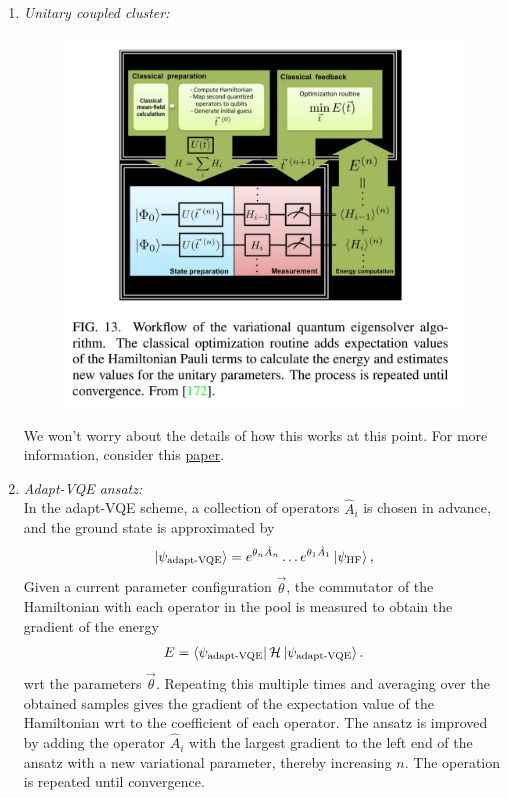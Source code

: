 \documentclass{book}
\theoremstyle{definition}
\newcommand{\had}{\mathcal{H}}
\begin{document}
\begin{enumerate}
	\item \textit{Unitary coupled cluster:} \\
	
	\begin{figure}[!htb]
		\centering
		\includegraphics[scale=0.3]{vqei}
	\end{figure}
	We won't worry about the details of how this works at this point. For more information, consider this \href{https://iopscience.iop.org/article/10.1088/2058-9565/aad3e4/pdf}{\underline{paper}}.
	

	
	\item \textit{Adapt-VQE ansatz:}\\
	
	In the adapt-VQE scheme, a collection of operators $\hat{A}_i$ is chosen in advance, and the ground state is approximated by 
	\begin{align}
	\ket{\psi_{\text{adapt-VQE}}} = e^{\theta_n \hat{A}_n}\dots e^{\theta_1 \hat{A}_1}\ket{\psi_{\text{HF}}},
	\end{align}
	Given a current parameter configuration $\vec{\theta}$, the commutator  of the Hamiltonian with each operator in the pool is measured to obtain the gradient of the energy
	\begin{align}
	E = \bra{\psi_{\text{adapt-VQE}}} \had \ket{\psi_{\text{adapt-VQE}}}.
	\end{align}
	wrt the parameters $\vec{\theta}$. Repeating this multiple times and averaging over the obtained samples gives the gradient of the expectation value of the Hamiltonian wrt to the coefficient of each operator. The ansatz is improved by adding the operator $\hat{A}_i$ with the largest gradient to the left end of the ansatz with a new variational parameter, thereby increasing $n$. The operation is repeated until convergence.  
	

\end{enumerate}
\end{document}
